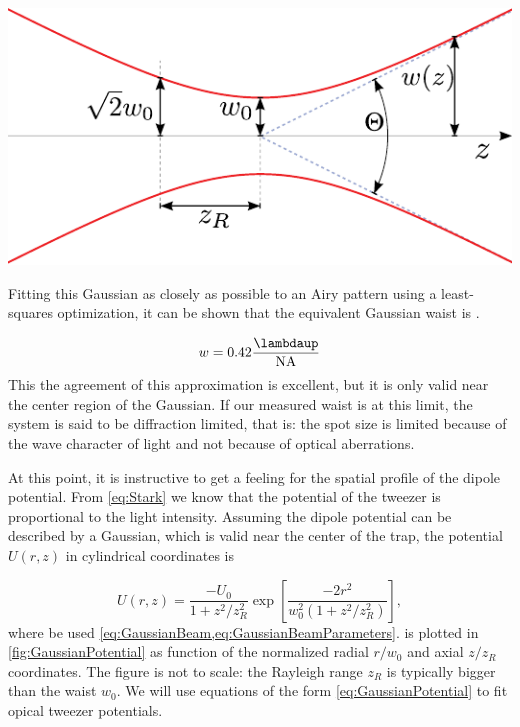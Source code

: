 \begin{mdframed}
    \vspace*{3mm}
    \centering
        \includegraphics[width=0.5\linewidth]{figures/GaussianBeam.pdf}
        \captionsetup{margin=0mm}%
        \label{fig:GaussianBeam}
\end{mdframed}

Fitting this Gaussian as closely as possible to an Airy pattern using a least-squares optimization, it can be shown that the equivalent Gaussian waist is \cite{Zhang2007}.

\begin{equation}\label{eq:GaussianAiryFit}
    w = 0.42 \frac{\lambdaup}{\text{NA}}
\end{equation}
This the agreement of this approximation is excellent, but it is only valid near the center region of the Gaussian. 
If our measured waist is at this limit, the system is said to be diffraction limited, that is: the spot size is limited because of the wave character of light and not because of optical aberrations. 

At this point, it is instructive to get a feeling for the spatial profile of the dipole potential.
From \cref{eq:Stark} we know that the potential of the tweezer is proportional to the light intensity. 
Assuming the dipole potential can be described by a Gaussian, which is valid \cite{Zhang2007} near the center of the trap, the potential $U(r,z)$ in cylindrical coordinates is

\begin{equation}\label{eq:GaussianPotential}
    U(r,z)=\frac{-U_{0}}{1+z^{2} / z_{R}^{2}} \exp \left[\frac{-2 r^{2}}{w_{0}^{2}\left(1+z^{2} / z_{R}^{2}\right)}\right],
\end{equation}
where be used \cref{eq:GaussianBeam,eq:GaussianBeamParameters}.
 is plotted in \cref{fig:GaussianPotential} as function of the normalized radial $r/w_0$ and axial $z/z_R$ coordinates. 
The figure is not to scale: the Rayleigh range $z_R$ is typically bigger than the waist $w_0$.
We will use equations of the form \cref{eq:GaussianPotential} to fit opical tweezer potentials.

